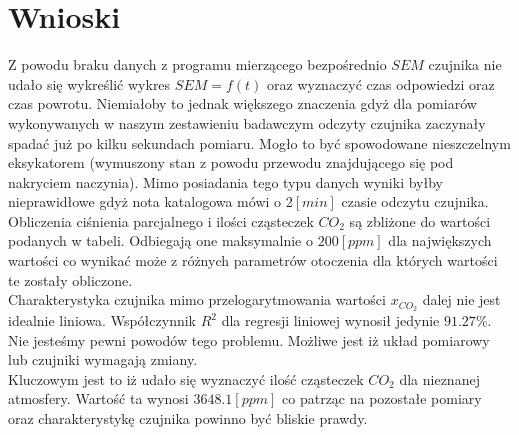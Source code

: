 \documentclass[11pt]{article}
\begin{document}
    \section{Wnioski}
    \par Z powodu braku danych z programu mierzącego bezpośrednio $SEM$ czujnika nie udało się wykreślić wykres $SEM=f(t)$ oraz wyznaczyć
    czas odpowiedzi oraz czas powrotu. Niemiałoby to jednak większego znaczenia gdyż dla pomiarów wykonywanych w naszym zestawieniu badawczym
    odczyty czujnika zaczynały spadać już po kilku sekundach pomiaru. Mogło to być spowodowane nieszczelnym eksykatorem (wymuszony stan z powodu przewodu
    znajdującego się pod nakryciem naczynia). Mimo posiadania tego typu danych wyniki byłby nieprawidłowe gdyż nota katalogowa mówi o $2[min]$ czasie
    odczytu czujnika.\\
    \indent Obliczenia ciśnienia parcjalnego i ilości cząsteczek $CO_2$ są zbliżone do wartości podanych w tabeli. Odbiegają one maksymalnie o $200[ppm]$
    dla największych wartości co wynikać może z różnych parametrów otoczenia dla których wartości te zostały obliczone.\\
    \indent Charakterystyka czujnika mimo przelogarytmowania wartości $x_{CO_2}$ dalej nie jest idealnie liniowa. Współczynnik $R^2$ dla regresji
    liniowej wynosił jedynie $91.27\%$. Nie jesteśmy pewni powodów tego problemu. Możliwe jest iż układ pomiarowy lub czujniki wymagają zmiany.\\
    \indent Kluczowym jest to iż udało się wyznaczyć ilość cząsteczek $CO_2$ dla nieznanej atmosfery. Wartość ta wynosi $3648.1[ppm]$ co patrząc na
    pozostałe pomiary oraz charakterystykę czujnika powinno być bliskie prawdy.


\end{document}

